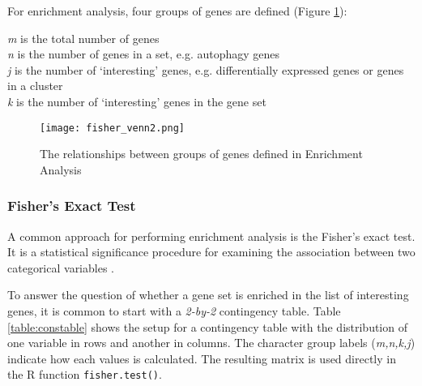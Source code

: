         For enrichment analysis, four groups of genes are defined (Figure \ref{fig:fishervenn}):
        
        \begin{itemize}
        \textit{m} is the total number of genes\\
        \textit{n} is the number of genes in a set, e.g. autophagy genes\\
        \textit{j}  is the number of ‘interesting’ genes, e.g. differentially expressed genes or genes in a cluster\\
        \textit{k} is the number of ‘interesting’ genes in the gene set\\
        \end{itemize}
        
                    \begin{figure}[!h]
                    \centering
                   \texttt{[image: fisher\_venn2.png]}
                    \caption{The relationships between groups of genes defined in Enrichment Analysis}
                    \label{fig:fishervenn}
                    \end{figure}
                    
        \subsubsection{Fisher's Exact Test}
        
        A common approach for performing enrichment analysis is the Fisher’s exact test. It is a statistical significance procedure for examining the association between two categorical variables \cite{Fishersexacttest}. 
        
        To answer the question of whether a gene set is enriched in the list of interesting genes, it is common to start with a \textit{2-by-2} contingency table. Table \ref{table:constable} shows the setup for a contingency table with the distribution of one variable in rows and another in columns. The character group labels (\textit{m,n,k,j}) indicate how each values is calculated. The resulting matrix is used directly in the R function \texttt{fisher.test()}. 
        
